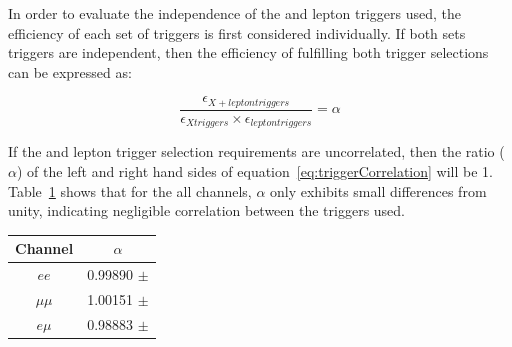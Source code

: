 In order to evaluate the independence of the \MET and lepton triggers used, the efficiency of each set of triggers is first considered individually.
If both sets triggers are independent, then the efficiency of fulfilling both trigger selections can be expressed as:

\begin{equation}
\frac{\epsilon_{X + lepton triggers}}{\epsilon_{X triggers} \times \epsilon_{lepton triggers}} = \alpha
\label{eq:triggerCorrelation}
\end{equation}

If the \MET and lepton trigger selection requirements are uncorrelated, then the ratio ($\alpha$) of the left and right hand sides of equation~\ref{eq:triggerCorrelation} will be 1.
Table~\ref{tab:triggerCorrelation} shows that for the all channels, $\alpha$ only exhibits small differences from unity, indicating negligible correlation between the triggers used.

\begin{table}[htbp]
\label{tab:triggerCorrelation}
  \centering
 \begin{tabular}{cc}
   \hline
   \textbf{Channel} & \textbf{$\alpha$}   \\
   \hline   
   $ee$ & 0.99890 $\pm$ \\
   $\mu\mu$ & 1.00151 $\pm$  \\
   $e \mu$ & 0.98883 $\pm$ \\
   \hline
 \end{tabular}%
\end{table}

%


